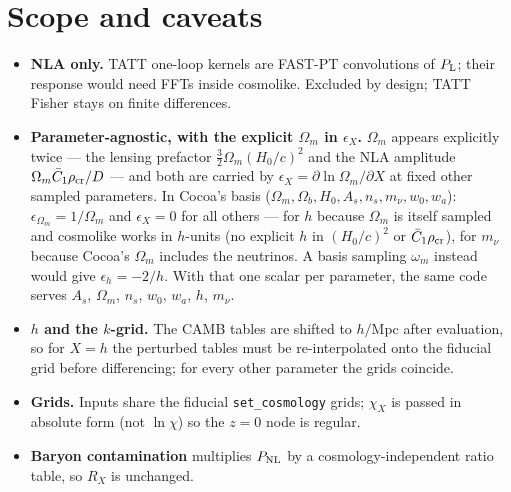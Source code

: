\documentclass[11pt]{article}
\begin{document}
\section{Scope and caveats}
\begin{itemize}
\item \textbf{NLA only.} TATT one-loop kernels are FAST-PT convolutions of
$P_{\rm L}$; their response would need FFTs inside cosmolike. Excluded by
design; TATT Fisher stays on finite differences.
\item \textbf{Parameter-agnostic, with the explicit $\Omega_m$ in
$\epsilon_X$.} $\Omega_m$ appears explicitly twice --- the lensing prefactor
$\tfrac32\Omega_m(H_0/c)^2$ and the NLA amplitude
$\Omega_m\bar C_1\rho_{\rm cr}/D$ --- and both are carried by
$\epsilon_X=\partial\ln\Omega_m/\partial X$ at fixed other sampled
parameters. In Cocoa's basis ($\Omega_m,\Omega_b,H_0,A_s,n_s,m_\nu,w_0,w_a$):
$\epsilon_{\Omega_m}=1/\Omega_m$ and $\epsilon_X=0$ for all others --- for $h$
because $\Omega_m$ is itself sampled and cosmolike works in $h$-units (no
explicit $h$ in $(H_0/c)^2$ or $\bar C_1\rho_{\rm cr}$), for $m_\nu$ because
Cocoa's $\Omega_m$ includes the neutrinos. A basis sampling $\omega_m$
instead would give $\epsilon_h=-2/h$. With that one scalar per parameter,
the same code serves $A_s$, $\Omega_m$, $n_s$, $w_0$, $w_a$, $h$, $m_\nu$.
\item \textbf{$h$ and the $k$-grid.} The CAMB tables are shifted to
$h/$Mpc after evaluation, so for $X=h$ the perturbed tables must be
re-interpolated onto the fiducial grid before differencing; for every
other parameter the grids coincide.
\item \textbf{Grids.} Inputs share the fiducial \texttt{set\_cosmology}
grids; $\chi_X$ is passed in absolute form (not $\ln\chi$) so the $z=0$ node
is regular.
\item \textbf{Baryon contamination} multiplies $P_{\rm NL}$ by a
cosmology-independent ratio table, so $R_X$ is unchanged.
\end{itemize}
\end{document}

